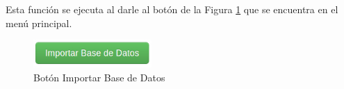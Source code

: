 Esta función se ejecuta al darle al botón de la Figura \ref{fig:import} que se encuentra en el menú principal.\\


\begin{figure}[H]
\begin{center}
\includegraphics[width=0.40\textwidth]{images/import.jpg}
\caption{Botón Importar Base de Datos}
\label{fig:import}
\end{center}
\end{figure}